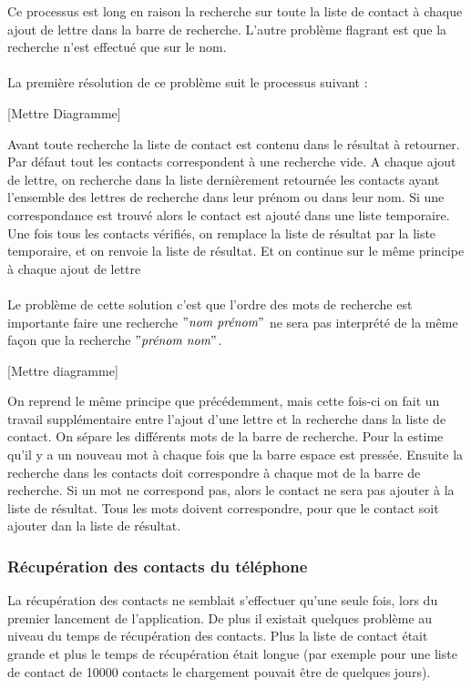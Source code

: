 Ce processus est long en raison la recherche sur toute la liste de contact à chaque ajout de lettre dans la barre de recherche. L'autre problème flagrant est que la recherche n'est effectué que sur le nom.\\\\

La première résolution de ce problème suit le processus suivant :

[Mettre Diagramme]

Avant toute recherche la liste de contact est contenu dans le résultat à retourner. Par défaut tout les contacts correspondent à une recherche vide. A chaque ajout de lettre, on recherche dans la liste dernièrement retournée les contacts ayant l'ensemble des lettres de recherche dans leur prénom ou dans leur nom. Si une correspondance est trouvé alors le contact est ajouté dans une liste temporaire. Une fois tous les contacts vérifiés, on remplace la liste de résultat par la liste temporaire, et on renvoie la liste de résultat. Et on continue sur le même principe à chaque ajout de lettre\\\\

Le problème de cette solution c'est que l'ordre des mots de recherche est importante faire une recherche $"\textit{nom prénom}"$ ne sera pas interprété de la même façon que la recherche $"\textit{prénom nom}"$.

[Mettre diagramme]

On reprend le même principe que précédemment, mais cette fois-ci on fait un travail supplémentaire entre l'ajout d'une lettre et la recherche dans la liste de contact. On sépare les différents mots de la barre de recherche. Pour la estime qu'il y a un nouveau mot à chaque fois que la barre espace est pressée. Ensuite la recherche dans les contacts doit correspondre à chaque mot de la barre de recherche. Si un mot ne correspond pas, alors le contact ne sera pas ajouter à la liste de résultat. Tous les mots doivent correspondre, pour que le contact soit ajouter dan la liste de résultat.

\subsubsection{Récupération des contacts du téléphone}

La récupération des contacts ne semblait s'effectuer qu'une seule fois, lors du premier lancement de l'application. De plus il existait quelques problème au niveau du temps de récupération des contacts. Plus la liste de contact était grande et plus le temps de récupération était longue (par exemple pour une liste de contact de 10000 contacts le chargement pouvait être de quelques jours).\\


